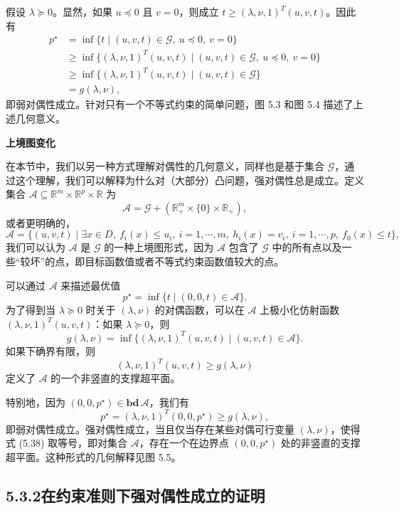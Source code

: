 \documentclass[UTF8, 12pt, fontset=fandol, oneside]{ctexart}
\begin{document}
假设 $\lambda\succeq 0$。显然，如果 $u\preceq 0$ 且 $v=0$，则成立 $t\geq(\lambda,\nu,1)^T(u,v,t)$。因此有
\[
\begin{aligned}
p^\star
&=\inf\{t\mid (u,v,t)\in\mathcal{G},\ u\preceq 0,\ v=0\}\\
&\geq \inf\{(\lambda,\nu,1)^T(u,v,t)\mid (u,v,t)\in\mathcal{G},\ u\preceq 0,\ v=0\}\\
&\geq \inf\{(\lambda,\nu,1)^T(u,v,t)\mid (u,v,t)\in\mathcal{G}\}\\
&=g(\lambda,\nu),
\end{aligned}
\]
即弱对偶性成立。针对只有一个不等式约束的简单问题，图 5.3 和图 5.4 描述了上述几何意义。

\noindent\textbf{上境图变化}

在本节中，我们以另一种方式理解对偶性的几何意义，同样也是基于集合 $\mathcal{G}$，通过这个理解，我们可以解释为什么对（大部分）凸问题，强对偶性总是成立。定义集合 $\mathcal{A}\subseteq\mathbb{R}^m\times\mathbb{R}^p\times\mathbb{R}$ 为
\begin{equation}
\mathcal{A}=\mathcal{G}+(\mathbb{R}_+^m\times\{0\}\times\mathbb{R}_+),
\tag{5.37}
\end{equation}
或者更明确的，
\[
\mathcal{A}=\{(u,v,t)\mid \exists x\in D,\ f_i(x)\leq u_i,\ i=1,\cdots,m,\ h_i(x)=v_i,\ i=1,\cdots,p,\ f_0(x)\leq t\},
\]
我们可以认为 $\mathcal{A}$ 是 $\mathcal{G}$ 的一种上境图形式，因为 $\mathcal{A}$ 包含了 $\mathcal{G}$ 中的所有点以及一些“较坏”的点，即目标函数值或者不等式约束函数值较大的点。

可以通过 $\mathcal{A}$ 来描述最优值
\[
p^\star=\inf\{t\mid (0,0,t)\in\mathcal{A}\}.
\]
为了得到当 $\lambda\succeq 0$ 时关于 $(\lambda,\nu)$ 的对偶函数，可以在 $\mathcal{A}$ 上极小化仿射函数 $(\lambda,\nu,1)^T(u,v,t)$：如果 $\lambda\succeq 0$，则
\[
g(\lambda,\nu)=\inf\{(\lambda,\nu,1)^T(u,v,t)\mid (u,v,t)\in\mathcal{A}\}.
\]
如果下确界有限，则
\[
(\lambda,\nu,1)^T(u,v,t)\geq g(\lambda,\nu)
\]
定义了 $\mathcal{A}$ 的一个非竖直的支撑超平面。

特别地，因为 $(0,0,p^\star)\in\mathbf{bd}\,\mathcal{A}$，我们有
\begin{equation}
p^\star=(\lambda,\nu,1)^T(0,0,p^\star)\geq g(\lambda,\nu),
\tag{5.38}
\end{equation}
即弱对偶性成立。强对偶性成立，当且仅当存在某些对偶可行变量 $(\lambda,\nu)$，使得式 (5.38) 取等号，即对集合 $\mathcal{A}$，存在一个在边界点 $(0,0,p^\star)$ 处的非竖直的支撑超平面。这种形式的几何解释见图 5.5。

\subsection*{5.3.2\quad 在约束准则下强对偶性成立的证明}
\end{document}
